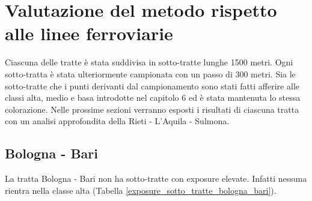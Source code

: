
\chapter{Valutazione del metodo rispetto alle linee ferroviarie} 
Ciascuna delle tratte è stata suddivisa in sotto-tratte lunghe 1500 metri. Ogni sotto-tratta è stata ulteriormente campionata con un passo di 300 metri. Sia le sotto-tratte che i punti derivanti dal campionamento sono stati fatti afferire alle classi alta, medio e basa introdotte nel capitolo 6 ed è stata mantenuta lo stessa colorazione. Nelle prossime sezioni verranno esposti i risultati di ciascuna tratta con un analisi approfondita della Rieti - L'Aquila - Sulmona.

\section{Bologna - Bari}
La tratta Bologna - Bari non ha sotto-tratte con exposure elevate. Infatti nessuna rientra nella classe alta (Tabella \ref{exposure_sotto_tratte_bologna_bari}).
\tiny
